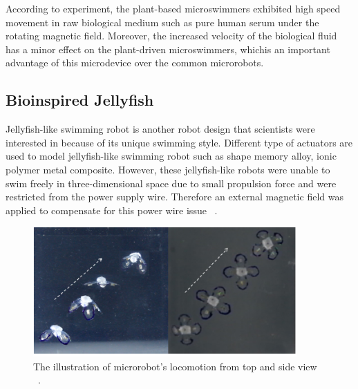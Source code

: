 \documentclass[a4paper,11pt]{article}
\begin{document}
\begin{sloppypar}
According to \citeauthor{gao2013bioinspired} experiment, the plant-based 
microswimmers exhibited high speed movement in raw biological medium such as 
pure human serum under the rotating magnetic field. Moreover, the increased velocity of the 
biological fluid has a minor effect on the plant-driven microswimmers, whichis an important 
advantage of this microdevice over the common microrobots.



\subsection{Bioinspired Jellyfish}
Jellyfish-like swimming robot is another robot design that scientists were interested 
in because of its unique swimming style. Different type of actuators are used to model
 jellyfish-like swimming robot such as shape memory alloy, ionic polymer metal 
composite. However, these jellyfish-like robots were unable to swim freely in 
three-dimensional space due to small propulsion force and were restricted from
 the power supply wire. Therefore an external magnetic field was applied to compensate 
for this power wire issue ~\citep{ko2012jellyfish}.

\begin{figure}
  \centering
    \includegraphics[width=0.9\textwidth]{jellyfish}
  \caption{ The illustration of microrobot\rq{}s locomotion from top and side view ~\citep{ko2012jellyfish}.}
  \label{jellyfish}
\end{figure}

\begin{table}[h!]
  \centering

\setlength{\arrayrulewidth}{.6mm}
\setlength{\tabcolsep}{5pt}
\renewcommand{\arraystretch}{.8}



\end{table}
\end{sloppypar}
\end{document}
